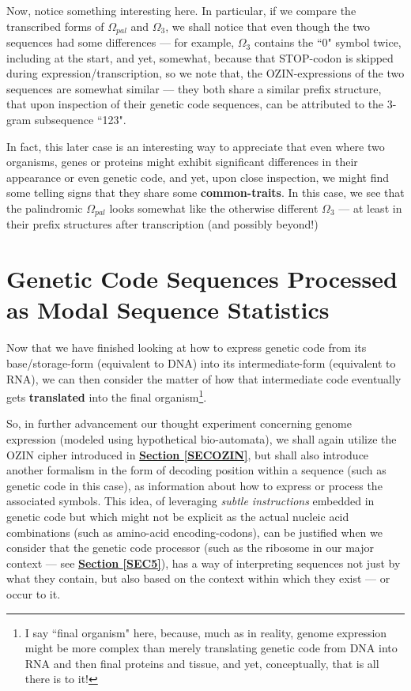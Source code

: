 \documentclass[a4paper, 18pt]{book} %
\begin{document}
Now, notice something interesting here. In particular, if we compare the transcribed forms of $\Omega_{pal}$ and $\Omega_{3}$, we shall notice that even though the two sequences had some differences --- for example, $\Omega_{3}$ contains the ``0" symbol twice, including at the start, and yet, somewhat, because that STOP-codon is skipped during expression/transcription, so we note that, the OZIN-expressions of the two sequences are somewhat similar --- they both share a similar prefix structure, that upon inspection of their genetic code sequences, can be attributed to the 3-gram subsequence ``123".

In fact, this later case is an interesting way to appreciate that even where two organisms, genes or proteins might exhibit significant differences in their appearance or even genetic code, and yet, upon close inspection, we might find some telling signs that they share some \textbf{common-traits}. In this case, we see that the palindromic $\Omega_{pal}$ looks somewhat like the otherwise different $\Omega_{3}$ --- at least in their prefix structures after transcription (and possibly beyond!)

\section{Genetic Code Sequences Processed as Modal Sequence Statistics}
\label{SECGENEXPRE}

Now that we have finished looking at how to express genetic code from its base/storage-form (equivalent to DNA) into its intermediate-form (equivalent to RNA), we can then consider the matter of how that intermediate code eventually gets \textbf{translated} into the final organism\footnote{I say ``final organism" here, because, much as in reality, genome expression might be more complex than merely translating genetic code from DNA into RNA and then final proteins and tissue, and yet, conceptually, that is all there is to it!}.

So, in further advancement our thought experiment concerning genome expression (modeled using hypothetical bio-automata), we shall again utilize the OZIN cipher introduced in \textbf{\hyperref[SECOZIN]{Section \ref{SECOZIN}}}, but shall also introduce another formalism in the form of decoding position within a sequence (such as genetic code in this case), as information about how to express or process the associated symbols. This idea, of leveraging \textit{subtle instructions} embedded in genetic code but which might not be explicit as the actual nucleic acid combinations (such as amino-acid encoding-codons), can be justified when we consider that the genetic code processor (such as the ribosome in our major context --- see \textbf{\hyperref[SEC5]{Section \ref{SEC5}}}), has a way of interpreting sequences not just by what they contain, but also based on the context within which they exist --- or occur to it. 
\end{document}
